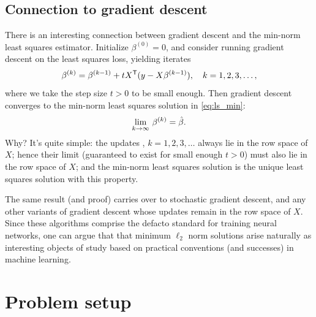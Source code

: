 \documentclass{article}
\begin{document}
\subsection{Connection to gradient descent}

There is an interesting connection between gradient descent and the min-norm
least squares estimator. Initialize $\beta^{(0)} = 0$, and consider running
gradient descent on the least squares loss, yielding iterates
\[
\beta^{(k)} = \beta^{(k-1)} + t X^{\mathsf{T}} (y-X\beta^{(k-1)}), 
\quad k=1,2,3,\dots,
\]
where we take the step size $t>0$ to be small enough. Then gradient descent
converges to the min-norm least squares solution in \eqref{eq:ls_min}:
\[
\lim_{k \to \infty} \, \beta^{(k)} = \hat{\beta}.
\]
Why? It's quite simple: the updates , $k=1,2,3,\dots$
always lie in the row space of $X$; hence their limit (guaranteed to exist for
small enough $t>0$) must also lie in the row space of $X$; and the min-norm
least squares solution is the unique least squares solution with this property.    

The same result (and proof) carries over to stochastic gradient descent, and any 
other variants of gradient descent whose updates remain in the row space of $X$.  
Since these algorithms comprise the defacto standard for training neural
networks, one can argue that that minimum $\ell_2$ norm solutions arise
naturally as interesting objects of study based on practical conventions (and
successes) in machine learning.  

\section{Problem setup}

\def\asto{\overset{\mathrm{as}}{\to}}
\def\dto{\overset{d}{\to}}
\def\Risk{\mathrm{Risk}}
\def\Bias{\mathrm{Bias}}
\def\hSigma{\hat\Sigma}
\end{document}
